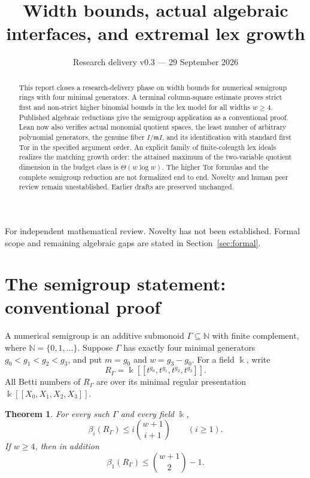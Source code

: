 \documentclass[11pt,a4paper]{article}
\title{Width bounds, actual algebraic interfaces, and extremal lex growth}
\author{}
\date{Research delivery v0.3 --- 29 September 2026}
\newtheorem{theorem}{Theorem}[section]
\newcommand{\NN}{\mathbb N}
\newcommand{\kk}{\Bbbk}
\newcommand{\llbracket}{[\![}
\newcommand{\rrbracket}{]\!]}
\begin{document}
\maketitle
\vspace{-1.4em}
\begin{center}\small
For independent mathematical review. Novelty has not been established.
Formal scope and remaining algebraic gaps are stated in Section~\ref{sec:formal}.
\end{center}
\begin{abstract}
This report closes a research-delivery phase on width bounds for numerical
semigroup rings with four minimal generators. A terminal column-square estimate
proves strict first and non-strict higher binomial bounds in the lex model for
all widths $w\ge4$. Published algebraic reductions give the semigroup application
as a conventional proof. Lean now also verifies actual monomial quotient spaces,
the least number of arbitrary polynomial generators, the genuine fiber $I/\mathfrak mI$,
and its identification with standard first Tor in the specified argument order.
An explicit family of finite-colength lex ideals realizes the matching growth
order: the attained maximum of the two-variable quotient dimension in the
budget class is $\Theta(w\log w)$. The higher Tor formulas and the complete
semigroup reduction are not formalized end to end. Novelty and human peer review
remain unestablished. Earlier drafts are preserved unchanged.
\end{abstract}

\section{The semigroup statement: conventional proof}
A numerical semigroup is an additive submonoid $\Gamma\subseteq\NN$ with finite complement, where $\NN=\{0,1,\ldots\}$. Suppose $\Gamma$ has exactly four minimal generators $g_0<g_1<g_2<g_3$, and put $m=g_0$ and $w=g_3-g_0$. For a field $\kk$, write
\[
 R_\Gamma=\kk\llbracket t^{g_0},t^{g_1},t^{g_2},t^{g_3}\rrbracket.
\]
All Betti numbers of $R_\Gamma$ are over its minimal regular presentation $\kk\llbracket X_0,X_1,X_2,X_3\rrbracket$.

\begin{theorem}\label{thm:main}
For every such $\Gamma$ and every field $\kk$,
\[
 \beta_i(R_\Gamma)\le i\binom{w+1}{i+1}\qquad(i\ge1).
\]
If $w\ge4$, then in addition
\[
 \beta_1(R_\Gamma)\le\binom{w+1}{2}-1.
\]
\end{theorem}
\end{document}
